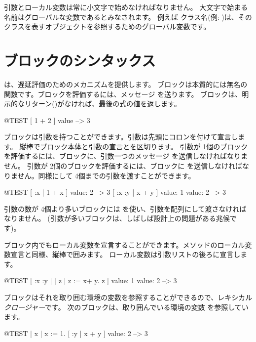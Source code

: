 \documentclass[a4paper,10pt,twoside]{book}
\begin{document}
引数とローカル変数は常に小文字で始めなければなりません。
大文字で始まる名前はグローバルな変数であるとみなされます。
例えば クラス名(例: )は、そのクラスを表すオブジェクトを参照するためのグローバル変数です。

\section{ブロックのシンタックス}

は、遅延評価のためのメカニズムを提供します。
ブロックは本質的には無名の関数です。ブロックを評価するには、メッセージ  を送ります。
ブロックは、明示的なリターン(\ct{^})がなければ、最後の式の値を返します。

\begin{code}{@TEST}
[ 1 + 2 ] value --> 3
\end{code}

ブロックは引数を持つことができます。引数は先頭にコロンを付けて宣言します。
縦棒でブロック本体と引数の宣言とを区切ります。
引数が 1個のブロックを評価するには、ブロックに、引数一つのメッセージ  を送信しなければなりません。
引数が 2個のブロックを評価するには、ブロックに を送信しなければなりません。同様にして 4個までの引数を渡すことができます。

\begin{code}{@TEST}
[ :x | 1 + x ] value: 2 --> 3
[ :x :y | x + y ] value: 1 value: 2 --> 3
\end{code}

引数の数が 4個より多いブロックには  を使い、引数を配列にして渡さなければなりません。
(引数が多いブロックは、しばしば設計上の問題がある兆候です)。

ブロック内でもローカル変数を宣言することができます。メソッドのローカル変数宣言と同様、縦棒で囲みます。
ローカル変数は引数リストの後ろに宣言します。

\begin{code}{@TEST}
[ :x :y | | z | z := x+ y. z ] value: 1 value: 2 --> 3
\end{code}

ブロックはそれを取り囲む環境の変数を参照することができるので、レキシカル\emph{クロージャー}です。
次のブロックは、取り囲んでいる環境の変数  を参照しています。

\begin{code}{@TEST}
| x |
x := 1.
[ :y | x + y ] value: 2 --> 3
\end{code}
\end{document}
